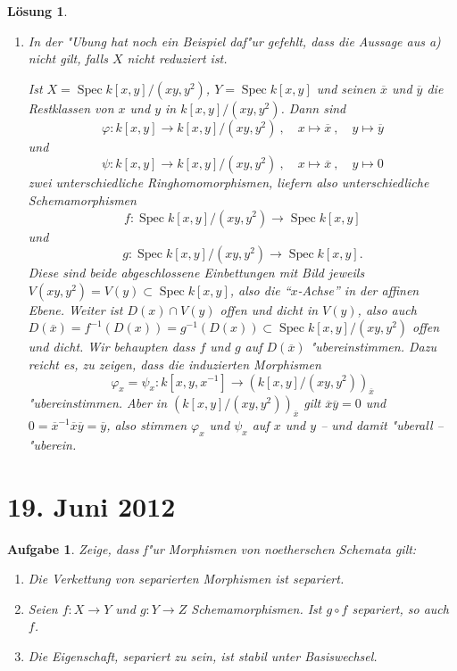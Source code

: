\documentclass[paper = A4, fontsize=12pt, numbers=noendperiod, chapterprefix=true]{scrbook}
\theoremstyle{break}
\newtheorem{Aufg}{Aufgabe}
\newtheorem{Loes}{L\"osung}
\theoremstyle{nonumberbreak}
\theoremstyle{nonumberplain}
\DeclareMathOperator{\Spec}{Spec}
\begin{document}
\begin{Loes}
\begin{enumerate}%
 \item[b)] In der "Ubung hat noch ein Beispiel daf"ur gefehlt, dass die Aussage aus a) nicht gilt, falls $X$ nicht reduziert ist.

  Ist $X = \Spec k[x,y]/(xy,y^2)$, $Y = \Spec k[x,y]$ und seinen $\overline{x}$ und $\overline{y}$ die 
 Restklassen von $x$ und $y$ in $k[x,y]/(xy,y^2)$.
 Dann sind
\[\varphi : k[x,y] \to k[x,y]/(xy,y^2)\ ,\quad x\mapsto \overline{x}\ ,\quad y\mapsto \overline{y}\]
und
\[\psi : k[x,y] \to k[x,y]/(xy,y^2)\ ,\quad x\mapsto \overline{x}\ ,\quad y\mapsto 0\]
zwei unterschiedliche Ringhomomorphismen, liefern also unterschiedliche Schemamorphismen
\[f: \Spec k[x,y]/(xy,y^2) \to \Spec k[x,y]\]
und
\[g: \Spec k[x,y]/(xy,y^2) \to \Spec k[x,y].\]
Diese sind beide abgeschlossene Einbettungen mit Bild jeweils $V(xy,y^2) = V(y) \subset \Spec k[x,y]$, also die ``$x$-Achse'' in der affinen Ebene. Weiter ist $D(x) \cap V(y)$ offen und dicht in $V(y)$, also auch $D(\overline{x}) = f^{-1}(D(x)) = g^{-1}(D(x)) \subset \Spec k[x,y]/(xy,y^2)$ offen und dicht. Wir behaupten dass $f$ und $g$ auf $D(\overline{x})$ "ubereinstimmen. Dazu reicht es, zu zeigen, dass die induzierten Morphismen
\[\varphi_{{x}} = \psi_{{x}} : k[x,y,x^{-1}] \to (k[x,y]/(xy,y^2))_{\overline{x}}\]
"ubereinstimmen. Aber in $(k[x,y]/(xy,y^2))_{\overline{x}}$ gilt $\overline{x}\overline{y} = 0$ und $0 = \overline{x}^{-1}\overline{x}\overline{y} = \overline{y}$, also stimmen $\varphi_x$ und $\psi_x$ auf $x$ und $y$ -- und damit "uberall -- "uberein.
\end{enumerate}

\end{Loes}
 
\newpage
\section{19. Juni 2012}
\setcounter{Aufg}{0}
\setcounter{Loes}{0}

\begin{Aufg}
Zeige, dass f"ur Morphismen von noetherschen Schemata gilt:
\begin{enumerate}%
 \item Die Verkettung von separierten Morphismen ist separiert.
 \item Seien $f \colon X \to Y$ und $g \colon Y \to Z$ Schemamorphismen. Ist $g\circ f$ separiert, so auch $f$.
 \item Die Eigenschaft, separiert zu sein, ist stabil unter Basiswechsel.
\end{enumerate}
\end{Aufg}
\end{document}
